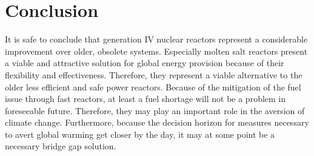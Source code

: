 \chapter{Conclusion}
It is safe to conclude that generation IV nuclear reactors represent a considerable improvement
over older, obsolete systems. Especially molten salt reactors present a viable and attractive
solution for global energy provision because of their flexibility and effectiveness.
Therefore, they represent a viable alternative to the older less
efficient and safe power reactors. Because of the mitigation of the fuel issue through fast reactors,
at least a fuel shortage will not be a problem in foreseeable future. Therefore, they may play an
important role in the aversion of climate change. Furthermore, because the decision horizon for
measures necessary to avert global warming get closer by the day, it may at some point be a
necessary bridge gap solution. 